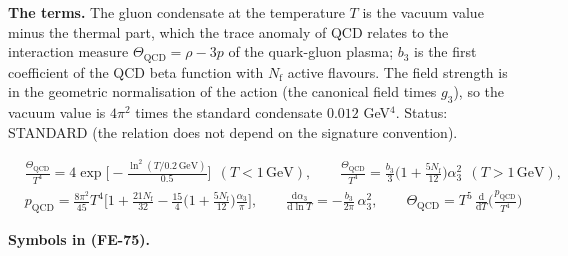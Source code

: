 \documentclass[
  10pt,
]{article}
\begin{document}
\textbf{The terms.} The gluon condensate at the temperature \(T\) is the
vacuum value minus the thermal part, which the trace anomaly of QCD
relates to the interaction measure \(\Theta_{\mathrm{QCD}} = \rho - 3p\)
of the quark-gluon plasma; \(b_3\) is the first coefficient of the QCD
beta function with \(N_{\mathrm{f}}\) active flavours. The field
strength is in the geometric normalisation of the action (the canonical
field times \(g_3\)), so the vacuum value is \(4\pi^2\) times the
standard condensate \(0.012\) GeV\(^4\). Status: STANDARD (the relation
does not depend on the signature convention).

\[
\begin{aligned}
&\frac{\Theta_{\mathrm{QCD}}}{T^4} = 4\exp\Big[-\frac{\ln^2(T/0.2\,\text{GeV})}{0.5}\Big]\ \ (T <
 1\,\text{GeV}),\qquad
 \frac{\Theta_{\mathrm{QCD}}}{T^4} = \frac{b_3}{3}\Big(1 +
 \frac{5N_{\mathrm{f}}}{12}\Big)\alpha_3^2\ \ (T > 1\,\text{GeV}),\\
&p_{\mathrm{QCD}} = \frac{8\pi^2}{45}T^4\Big[1 + \frac{21N_{\mathrm{f}}}{32}
 - \frac{15}{4}\Big(1 + \frac{5N_{\mathrm{f}}}{12}\Big)\frac{\alpha_3}{\pi}\Big],\qquad
 \frac{\mathrm{d}\alpha_3}{\mathrm{d}\ln T} = -\frac{b_3}{2\pi}\,\alpha_3^2,\qquad
 \Theta_{\mathrm{QCD}} = T^5\,\frac{\mathrm{d}}{\mathrm{d}T}\Big(\frac{p_{\mathrm{QCD}}}{T^4}\Big)
\end{aligned} \tag{FE-75}
\]

\textbf{Symbols in (FE-75).}
\end{document}
